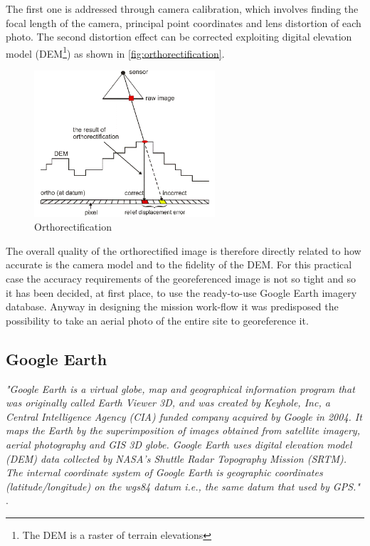 The first one is addressed through camera calibration, which involves finding the focal length of the camera, principal point coordinates and lens distortion of each photo.
The second distortion effect can be corrected exploiting digital elevation model (DEM\footnote{The DEM is a raster of terrain elevations}) as shown in \autoref{fig:orthorectification}.
\begin{figure}[ht]
    \centering
    \includegraphics[width=0.6\textwidth]{figures/C2/Ortophoto.png}
    \caption{Orthorectification}
    \label{fig:orthorectification}
\end{figure}
The overall quality of the orthorectified image is therefore directly related to how accurate is the camera model and to the fidelity of the DEM. For this practical case the accuracy requirements of the georeferenced image is not so tight and so it has been decided, at first place, to use the ready-to-use Google Earth imagery database. Anyway in designing the mission work-flow it was predisposed the possibility to take an aerial photo of the entire site to georeference it.

\subsection{Google Earth} %
\label{ssec:orthophoto_database}

\textit{"Google Earth is a virtual globe, map and geographical information program that was originally called Earth Viewer 3D, and was created by Keyhole, Inc, a Central Intelligence Agency (CIA) funded company acquired by Google in 2004. It maps the Earth by the superimposition of images obtained from satellite imagery, aerial photography and GIS 3D globe. Google Earth uses digital elevation model (DEM) data collected by NASA's Shuttle Radar Topography Mission (SRTM). The internal coordinate system of Google Earth is geographic coordinates (latitude/longitude) on the \acrfull{wgs84} datum i.e., the same datum that used by GPS."} \cite{PosAccuracyGE}.\\

